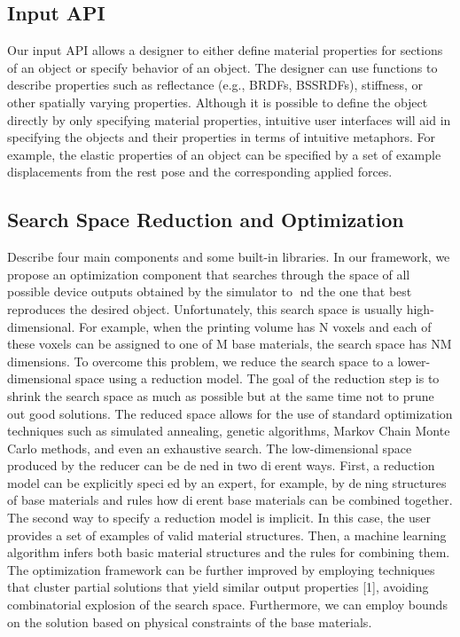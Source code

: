 \documentclass[annual]{acmsiggraph}
\begin{document}
\subsection{Input API}
Our input API allows a designer to either
define material properties for sections of an object
or specify behavior of an object. 
The designer
can use functions to describe properties such as reflectance (e.g., BRDFs, BSSRDFs), 
stiffness, or other spatially varying properties. 
Although it is possible to define the object directly by only specifying material
properties, intuitive user
interfaces will aid in specifying the objects and their properties
in terms of intuitive metaphors.
For example, the elastic properties of an object can be specified by a set of
example displacements from the rest pose and the corresponding applied forces.
\subsection{Search Space Reduction and Optimization}
Describe four main components and some built-in libraries.
In our
framework, we propose an optimization component that
searches through the space of all possible device outputs
obtained by the simulator to nd the one that best reproduces
the desired object. Unfortunately, this search space
is usually high-dimensional. For example, when the printing
volume has N voxels and each of these voxels can be
assigned to one of M base materials, the search space
has NM dimensions. To overcome this problem, we reduce
the search space to a lower-dimensional space using
a reduction model. The goal of the reduction step is to
shrink the search space as much as possible but at the
same time not to prune out good solutions. The reduced
space allows for the use of standard optimization techniques such as simulated annealing, genetic algorithms,
Markov Chain Monte Carlo methods, and even an exhaustive search. The low-dimensional space produced by the
reducer can be dened in two dierent ways. First, a reduction model can be explicitly specied by an expert, for
example, by dening structures of base materials and rules how dierent base materials can be combined together.
The second way to specify a reduction model is implicit. In this case, the user provides a set of examples of
valid material structures. Then, a machine learning algorithm infers both basic material structures and the rules
for combining them. The optimization framework can be further improved by employing techniques that cluster
partial solutions that yield similar output properties [1], avoiding combinatorial explosion of the search space.
Furthermore, we can employ bounds on the solution based on physical constraints of the base materials.
\end{document}
